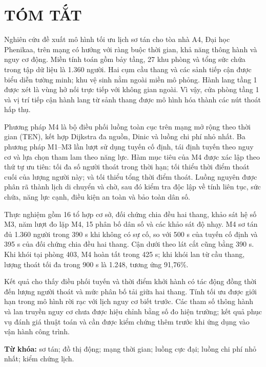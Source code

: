 \clearpage\section*{TÓM TẮT}
Nghiên cứu đề xuất mô hình tối ưu lịch sơ tán cho tòa nhà A4, Đại học Phenikaa, trên mạng có hướng với ràng buộc thời gian, khả năng thông hành và nguy cơ động. Miền tính toán gồm bảy tầng, 27 khu phòng và tổng sức chứa trong tập dữ liệu là 1.360 người. Hai cụm cầu thang và các sảnh tiếp cận được biểu diễn tường minh; khu vệ sinh nằm ngoài miền mô phỏng. Hành lang tầng 1 được xét là vùng hở nối trực tiếp với không gian ngoài. Vì vậy, cửa phòng tầng 1 và vị trí tiếp cận hành lang từ sảnh thang được mô hình hóa thành các nút thoát hấp thụ.

Phương pháp M4 là bộ điều phối luồng toàn cục trên mạng mở rộng theo thời gian (TEN), kết hợp Dijkstra đa nguồn, Dinic và luồng chi phí nhỏ nhất. Ba phương pháp M1--M3 lần lượt sử dụng tuyến cố định, tái định tuyến theo nguy cơ và lựa chọn tham lam theo năng lực. Hàm mục tiêu của M4 được xác lập theo thứ tự ưu tiên: tối đa số người thoát trong thời hạn; tối thiểu thời điểm thoát cuối của lượng người này; và tối thiểu tổng thời điểm thoát. Luồng nguyên được phân rã thành lịch di chuyển và chờ, sau đó kiểm tra độc lập về tính liên tục, sức chứa, năng lực cạnh, điều kiện an toàn và bảo toàn dân số.

Thực nghiệm gồm 16 tổ hợp cơ sở, đối chứng chia đều hai thang, khảo sát hệ số M3, năm lượt đo lặp M4, 15 phân bố dân số và các khảo sát độ nhạy. M4 sơ tán đủ 1.360 người trong 390 s khi không có sự cố, so với 500 s của tuyến cố định và 395 s của đối chứng chia đều hai thang. Cận dưới theo lát cắt cũng bằng 390 s. Khi khói tại phòng 403, M4 hoàn tất trong 425 s; khi khói lan từ cầu thang, lượng thoát tối đa trong 900 s là 1.248, tương ứng 91,76\%.

Kết quả cho thấy điều phối tuyến và thời điểm khởi hành có tác động đồng thời đến lượng người thoát và mức phân bố tải giữa hai thang. Tính tối ưu được giới hạn trong mô hình rời rạc với lịch nguy cơ biết trước. Các tham số thông hành và lan truyền nguy cơ chưa được hiệu chỉnh bằng số đo hiện trường; kết quả phục vụ đánh giá thuật toán và cần được kiểm chứng thêm trước khi ứng dụng vào vận hành công trình.

\noindent\textbf{Từ khóa:} sơ tán; đồ thị động; mạng thời gian; luồng cực đại; luồng chi phí nhỏ nhất; kiểm chứng lịch.
